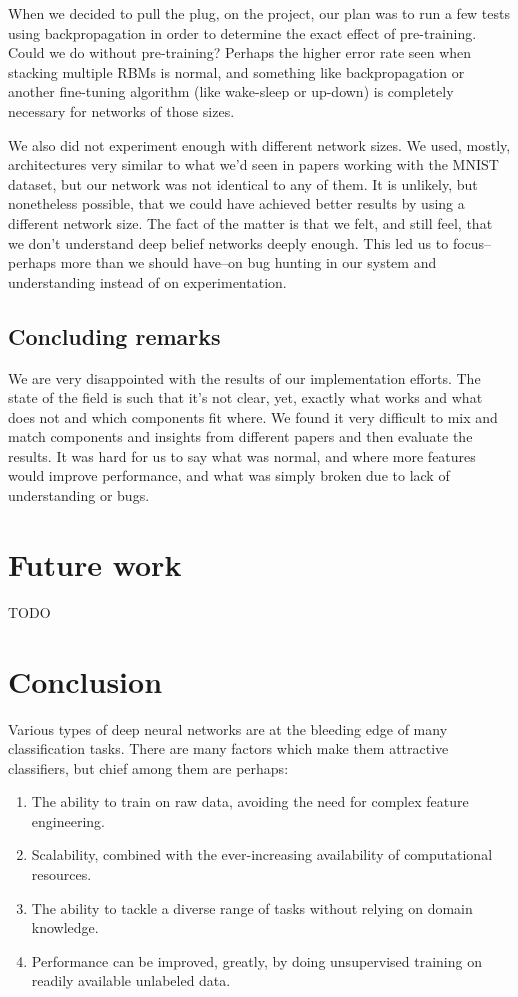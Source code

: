 \documentclass[11pt]{article}
\begin{document}
When we decided to pull the plug, on the project, our plan was to run a few tests using backpropagation in order to determine the exact effect of pre-training.  Could we do without pre-training?  Perhaps the higher error rate seen when stacking multiple RBMs is normal, and something like backpropagation or another fine-tuning algorithm (like wake-sleep or up-down) is completely necessary for networks of those sizes.

We also did not experiment enough with different network sizes.  We used, mostly, architectures very similar to what we'd seen in papers working with the MNIST dataset, but our network was not identical to any of them.  It is unlikely, but nonetheless possible, that we could have achieved better results by using a different network size.  The fact of the matter is that we felt, and still feel, that we don't understand deep belief networks deeply enough.  This led us to focus--perhaps more than we should have--on bug hunting in our system and understanding instead of on experimentation.

\subsection{Concluding remarks}

We are very disappointed with the results of our implementation efforts.  The state of the field is such that it's not clear, yet, exactly what works and what does not and which components fit where.  We found it very difficult to mix and match components and insights from different papers and then evaluate the results.  It was hard for us to say what was normal, and where more features would improve performance, and what was simply broken due to lack of understanding or bugs.

\section{Future work}
TODO

\section{Conclusion}

Various types of deep neural networks are at the bleeding edge of many classification tasks.  There are many factors which make them attractive classifiers, but chief among them are perhaps:
\begin{enumerate}
\item The ability to train on raw data, avoiding the need for complex feature engineering.
\item Scalability, combined with the ever-increasing availability of computational resources.
\item The ability to tackle a diverse range of tasks without relying on domain knowledge.
\item Performance can be improved, greatly, by doing unsupervised training on readily available unlabeled data.
\end{enumerate}
\end{document}
